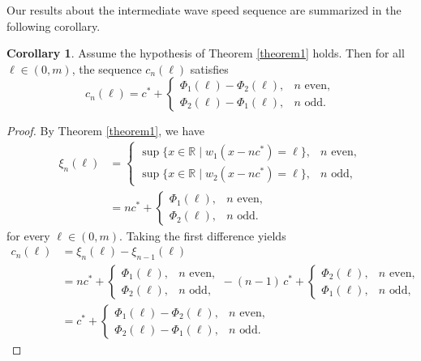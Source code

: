 \documentclass[11pt]{article}
\theoremstyle{definition}
\newtheorem{cor}[thm]{Corollary}
\numberwithin{equation}{section}
\numberwithin{thm}{section}
\newcommand{\m}{m}
\begin{document}
Our results about the intermediate wave speed sequence are summarized in the following corollary.

\begin{cor}\label{cor1}
Assume the hypothesis of Theorem \ref{theorem1} holds. Then for all $\ell \in (0, \m)$, the sequence $c_n(\ell)$ satisfies
\begin{equation}
c_n(\ell) = c^* + \begin{cases}
\Phi_1(\ell) - \Phi_2(\ell), & n \text{ even}, \\
\Phi_2(\ell) - \Phi_1(\ell), & n \text{ odd}.
\end{cases}
\end{equation}
\end{cor}

\begin{proof}
By Theorem \ref{theorem1}, we have
$$ \begin{aligned}
\xi_n(\ell) &= \begin{cases}
\sup\{x \in \mathbb R \mid w_1(x-nc^*) = \ell \}, & n \text{ even},\\
\sup\{x \in \mathbb R \mid w_2(x-nc^*) = \ell \}, & n \text{ odd},
\end{cases} \\
&= nc^* + \begin{cases}
\Phi_1(\ell), & n \text{ even}, \\
\Phi_2(\ell), & n \text{ odd}.
\end{cases}
\end{aligned}
$$
for every $\ell \in (0,\m)$. Taking the first difference yields
$$ \begin{aligned}
c_n(\ell) &= \xi_n(\ell) - \xi_{n-1}(\ell) \\
&= nc^* + \begin{cases}
\Phi_1(\ell), & n \text{ even}, \\
\Phi_2(\ell), & n \text{ odd},
\end{cases} - (n-1)\, c^* + \begin{cases}
\Phi_2(\ell), & n \text{ even}, \\
\Phi_1(\ell), & n \text{ odd},
\end{cases} \\
&= c^* + \begin{cases}
\Phi_1(\ell) - \Phi_2(\ell), & n \text{ even}, \\
\Phi_2(\ell) - \Phi_1(\ell), & n \text{ odd}.
\end{cases}
\end{aligned} $$
\end{proof}
\end{document}
